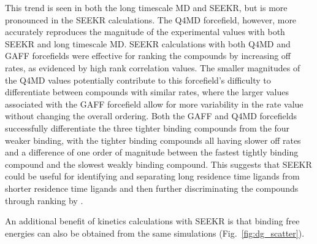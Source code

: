 This trend is seen in both the long timescale MD and SEEKR,
but is more pronounced in the SEEKR calculations. The Q4MD forcefield, however,
more accurately reproduces the magnitude of the experimental values with both
SEEKR and long timescale MD. SEEKR calculations with both Q4MD and GAFF
forcefields were effective for ranking the compounds by increasing off rates, as evidenced by high rank correlation values.
The smaller magnitudes of the Q4MD
values potentially contribute to this forcefield's difficulty to differentiate
between compounds with similar rates, where the larger values associated with
the GAFF forcefield allow for more variability in the rate value without changing
the overall ordering. Both the GAFF and Q4MD forcefields successfully differentiate
the three tighter binding compounds from the four weaker binding, with the tighter binding compounds
all having slower off rates and a difference of one order of magnitude between
the fastest tightly binding compound and the slowest weakly binding compound. This suggests that SEEKR
could be useful for identifying and separating long residence time ligands from
shorter residence time ligands and then further discriminating the compounds
through ranking by \koff.


\par An additional benefit of kinetics calculations with SEEKR is that binding
free energies can also be obtained from the same simulations (Fig.~\ref{fig:dg_scatter}).

